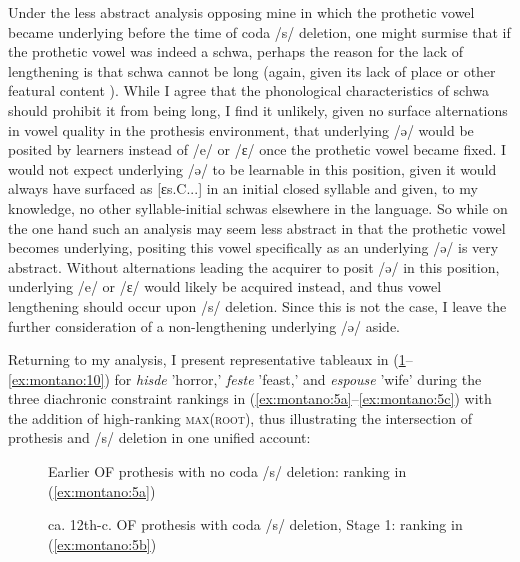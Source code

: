 \documentclass[output=paper,colorlinks,citecolor=brown,
]{langscibook}
\begin{document}
	Under the less abstract analysis opposing mine in which the prothetic vowel became underlying before the time of coda /s/ deletion, one might surmise that if the prothetic vowel was indeed a schwa, perhaps the reason for the lack of lengthening is that schwa cannot be long (again, given its lack of place or other featural content \citep{Eychenne2006, Rainsford2020}).  While I agree that the phonological characteristics of schwa should prohibit it from being long, I find it unlikely, given no surface alternations in vowel quality in the prothesis environment, that underlying /ə/ would be posited by learners instead of /e/ or /ɛ/ once the prothetic vowel became fixed.  I would not expect underlying /ə/ to be learnable in this position, given it would always have surfaced as [ɛs.C...] in an initial closed syllable and given, to my knowledge, no other syllable-initial schwas elsewhere in the language.  So while on the one hand such an analysis may seem less abstract in that the prothetic vowel becomes underlying, positing this vowel specifically as an underlying /ə/ is very abstract.  Without alternations leading the acquirer to posit /ə/ in this position, underlying /e/ or /ɛ/ would likely be acquired instead, and thus vowel lengthening should occur upon /s/ deletion.  Since this is not the case, I leave the further consideration of a non-lengthening underlying /ə/ aside.
	
	Returning to my analysis, I present representative tableaux in (\ref{ex:montano:8}--\ref{ex:montano:10}) for \textit{hisde} 'horror,' \textit{feste} 'feast,' and \textit{espouse} 'wife' during the three diachronic constraint rankings in (\ref{ex:montano:5a}--\ref{ex:montano:5c}) with the addition of high-ranking \textsc{max}(\textsc{root}), thus illustrating the intersection of prothesis and /s/ deletion in one unified account:
	
\begin{figure}
\caption{Earlier OF prothesis with no coda /s/ deletion: ranking in (\ref{ex:montano:5a})} 
\label{ex:montano:8}
\end{figure}

\begin{figure}
\caption{ca. 12th-c. OF prothesis with coda /s/ deletion, Stage 1: ranking in (\ref{ex:montano:5b})}  
\label{ex:montano:9}
\end{figure}
\end{document}
